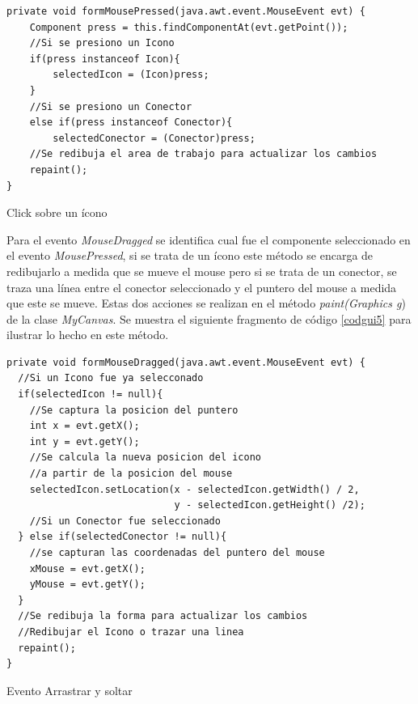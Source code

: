 \begin{codigof}[h]
\begin{verbatim}
private void formMousePressed(java.awt.event.MouseEvent evt) {
    Component press = this.findComponentAt(evt.getPoint());
    //Si se presiono un Icono
    if(press instanceof Icon){
        selectedIcon = (Icon)press;
    }
    //Si se presiono un Conector
    else if(press instanceof Conector){
        selectedConector = (Conector)press;
    //Se redibuja el area de trabajo para actualizar los cambios
    repaint();
}
\end{verbatim}
\caption{Click sobre un \'icono}
\label{codgui4}
\end{codigof}

Para el evento \textit{MouseDragged} se identifica cual fue el componente seleccionado en el evento
\textit{MousePressed}, si se trata de un \'icono este m\'etodo se encarga de redibujarlo a medida que se mueve el
mouse pero si se trata de un conector, se traza una l\'inea entre el conector seleccionado y el puntero del mouse
a medida que este se mueve.  Estas dos acciones se realizan en el m\'etodo\textit{ paint(Graphics g}) de la clase
\textit{MyCanvas}.  Se muestra el siguiente fragmento de c\'odigo \ref{codgui5} para ilustrar lo hecho en este
m\'etodo.\\

\begin{codigof}[t]
\begin{verbatim}
private void formMouseDragged(java.awt.event.MouseEvent evt) {
  //Si un Icono fue ya selecconado
  if(selectedIcon != null){
    //Se captura la posicion del puntero
    int x = evt.getX();
    int y = evt.getY();
    //Se calcula la nueva posicion del icono 
    //a partir de la posicion del mouse
    selectedIcon.setLocation(x - selectedIcon.getWidth() / 2,
                             y - selectedIcon.getHeight() /2);
    //Si un Conector fue seleccionado
  } else if(selectedConector != null){
    //se capturan las coordenadas del puntero del mouse
    xMouse = evt.getX();
    yMouse = evt.getY();
  }
  //Se redibuja la forma para actualizar los cambios
  //Redibujar el Icono o trazar una linea 
  repaint();
} 
\end{verbatim}
\caption{Evento Arrastrar y soltar}
\label{codgui5}
\end{codigof}


